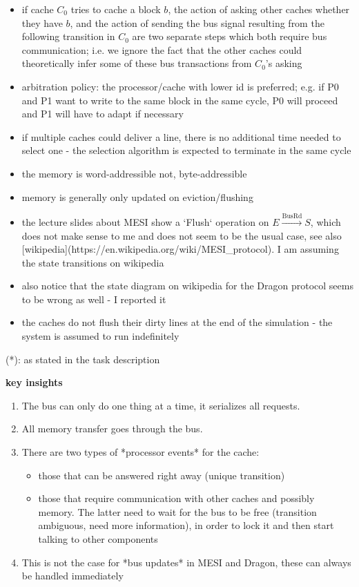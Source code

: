 \documentclass{article}
\begin{document}
\begin{multicols}{2}
\begin{itemize}
    \item if cache $C_0$ tries to cache a block $b$, the action of asking other caches whether they have $b$, and the action of sending the bus signal resulting from the following transition in $C_0$ are two separate steps which both require bus communication; i.e. we ignore the fact that the other caches could theoretically infer some of these bus transactions from $C_0$'s asking
    \item arbitration policy: the processor/cache with lower id is preferred; e.g. if P0 and P1 want to write to the same block in the same cycle, P0 will proceed and P1 will have to adapt if necessary
    \item if multiple caches could deliver a line, there is no additional time needed to select one - the selection algorithm is expected to terminate in the same cycle
    \item the memory is word-addressible not, byte-addressible
    \item memory is generally only updated on eviction/flushing
    \item the lecture slides about MESI show a `Flush` operation on $E\overset{\text{BusRd}}{\longrightarrow}S$, which does not make sense to me and does not seem to be the usual case, see also [wikipedia](https://en.wikipedia.org/wiki/MESI\_protocol). I am assuming the state transitions on wikipedia
    \item also notice that the state diagram on wikipedia for the Dragon protocol seems to be wrong as well - I reported it
    \item the caches do not flush their dirty lines at the end of the simulation - the system is assumed to run indefinitely
\end{itemize}

(*): as stated in the task description

\textbf{key insights}

\begin{enumerate}
    \item The bus can only do one thing at a time, it serializes all requests.
    \item All memory transfer goes through the bus.
    \item There are two types of *processor events* for the cache:
        \begin{itemize}
            \item those that can be answered right away (unique transition)
            \item those that require communication with other caches and possibly memory. The latter need to wait for the bus to be free (transition ambiguous, need more information), in order to lock it and then start talking to other components
        \end{itemize}
    \item This is not the case for *bus updates* in MESI and Dragon, these can always be handled immediately
\end{enumerate}


\end{multicols}
\end{document}
